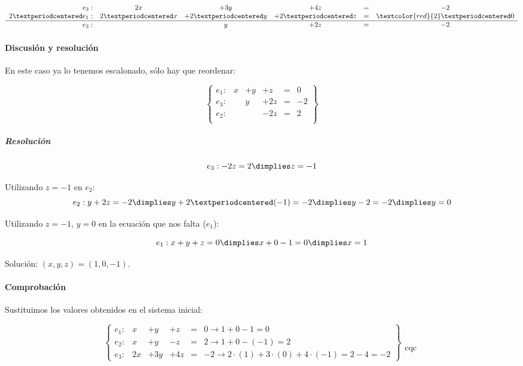 \documentclass[palatino,nosec,nochap]{Docencia}
\begin{document}
\begin{problem}
\[
\begin{array}{rccccc}
e_3: &2x&+3y&+4z&=&-2\\
2·e_1: &2·x&+2·y&+2·z&=&\textcolor{red}{2}·0\\
\hline
e_3: &&y&+2z&=&-2\\
\end{array}
\]	


\paragraph{Discusión y resolución}

En este caso ya lo tenemos escalonado, sólo hay que reordenar:

\[
\left\{\begin{array}{lccccc}
e_1: &x&+y&+z&=&0\\
e_3: &&y&+2z&=&-2\\
e_2: &&&-2z&=&2\\
\end{array}\right\}
\]

\subparagraph{Resolución}

\[e_3: -2z=2 \dimplies z=-1\]


Utilizando $z=-1$ en $e_2$:
\[e_2: y+2z=-2 \dimplies y+2·(-1) = -2 \dimplies y-2=-2 \dimplies y=0\]

Utilizando $z=-1$, $y=0$ en la ecuación que nos falta ($e_1$):

\[
e_1: x+y+z=0 \dimplies x+0-1=0 \dimplies x=1
\]


Solución: $(x,y,z) = (1,0,-1)$.

\paragraph{Comprobación}

Sustituimos los valores obtenidos en el sistema inicial:

\[
\left\{\begin{array}{lccccl}
e_1: &x&+y&+z&=&0 \to 1+0-1=0\\
e_2: &x&+y&-z&=&2 \to 1+0-(-1) = 2 \\
e_3: &2x&+3y&+4z&=&-2 \to 2·(1) + 3·(0) + 4·(-1) = 2-4=-2 
\end{array}\right\}\begin{array}{c}\\\\\\\\\text{cqc}\end{array}
\]

\end{problem}
\end{document}
